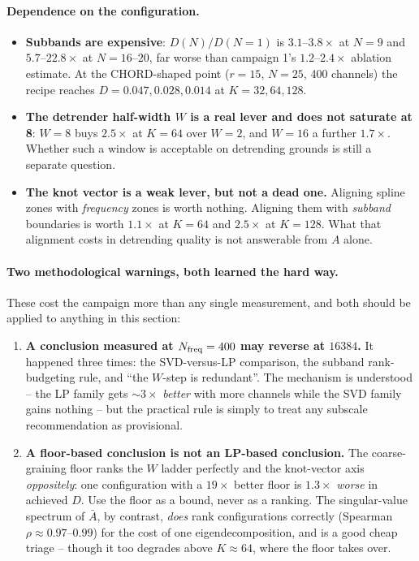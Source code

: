 \documentclass{article}
\numberwithin{equation}{section}   %
\begin{document}
\paragraph{Dependence on the configuration.}
\begin{itemize}
\item {\bf Subbands are expensive}: $D(N)/D(N{=}1)$ is $3.1$--$3.8\times$ at $N = 9$ and
 $5.7$--$22.8\times$ at $N = 16$--$20$, far worse than campaign 1's $1.2$--$2.4\times$ ablation
 estimate. At the CHORD-shaped point ($r = 15$, $N = 25$, 400 channels) the recipe reaches
 $D = 0.047, 0.028, 0.014$ at $K = 32, 64, 128$.
\item {\bf The detrender half-width $W$ is a real lever and does not saturate at 8}: $W = 8$ buys
 $2.5\times$ at $K = 64$ over $W = 2$, and $W = 16$ a further $1.7\times$. Whether such a window
 is acceptable on detrending grounds is still a separate question.
\item {\bf The knot vector is a weak lever, but not a dead one.} Aligning spline zones with
 {\em frequency} zones is worth nothing. Aligning them with {\em subband} boundaries is worth
 $1.1\times$ at $K = 64$ and $2.5\times$ at $K = 128$. What that alignment costs in detrending
 quality is not answerable from $A$ alone.
\end{itemize}

\paragraph{Two methodological warnings, both learned the hard way.}
These cost the campaign more than any single measurement, and both should be applied to anything
in this section:

\begin{enumerate}
\item {\bf A conclusion measured at $N_{\rm freq} = 400$ may reverse at $16384$.} It happened
 three times: the SVD-versus-LP comparison, the subband rank-budgeting rule, and ``the $W$-step is
 redundant''. The mechanism is understood -- the LP family gets $\sim 3\times$ {\em better} with
 more channels while the SVD family gains nothing -- but the practical rule is simply to treat any
 subscale recommendation as provisional.
\item {\bf A floor-based conclusion is not an LP-based conclusion.} The coarse-graining floor
 ranks the $W$ ladder perfectly and the knot-vector axis {\em oppositely}: one configuration with
 a $19\times$ better floor is $1.3\times$ {\em worse} in achieved $D$. Use the floor as a bound,
 never as a ranking. The singular-value spectrum of $\bar A$, by contrast, {\em does} rank
 configurations correctly (Spearman $\rho \approx 0.97$--$0.99$) for the cost of one
 eigendecomposition, and is a good cheap triage -- though it too degrades above $K \approx 64$,
 where the floor takes over.
\end{enumerate}
\end{document}

